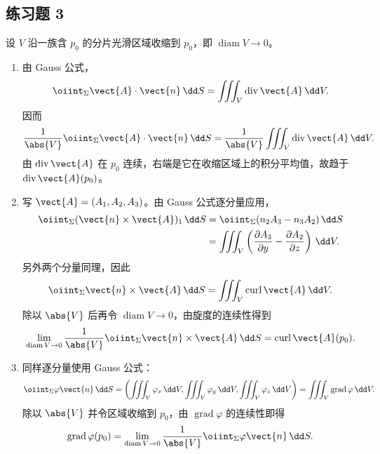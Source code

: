 \subsection*{练习题 3}
\begin{xsolution}
设 $V$ 沿一族含 $p_0$ 的分片光滑区域收缩到 $p_0$，即 $\operatorname{diam}V\to0$。

\begin{enumerate}[label=(\arabic*)]
  \item 由 Gauss 公式，
  \[
    \oiint_{\Sigma}\vect{A}\cdot\vect{n}\,\dd S
    =\iiint_V\operatorname{div}\vect{A}\,\dd V.
  \]
  因而
  \[
    \frac{1}{\abs{V}}\oiint_{\Sigma}\vect{A}\cdot\vect{n}\,\dd S
    =\frac{1}{\abs{V}}\iiint_V\operatorname{div}\vect{A}\,\dd V.
  \]
  由 $\operatorname{div}\vect{A}$ 在 $p_0$ 连续，右端是它在收缩区域上的积分平均值，故趋于 $\operatorname{div}\vect{A}(p_0)$。

  \item 写 $\vect{A}=(A_1,A_2,A_3)$。由 Gauss 公式逐分量应用，
  \begin{align*}
    \oiint_\Sigma(\vect{n}\times\vect{A})_1\,\dd S
    &=\oiint_\Sigma(n_2A_3-n_3A_2)\,\dd S\\
    &=\iiint_V\left(\frac{\partial A_3}{\partial y}-\frac{\partial A_2}{\partial z}\right)\,\dd V.
  \end{align*}
  另外两个分量同理，因此
  \[
    \oiint_\Sigma\vect{n}\times\vect{A}\,\dd S
    =\iiint_V\operatorname{curl}\vect{A}\,\dd V.
  \]
  除以 $\abs{V}$ 后再令 $\operatorname{diam}V\to0$，由旋度的连续性得到
  \[
    \lim_{\operatorname{diam}V\to0}
    \frac{1}{\abs{V}}\oiint_\Sigma\vect{n}\times\vect{A}\,\dd S
    =\operatorname{curl}\vect{A}(p_0).
  \]

  \item 同样逐分量使用 Gauss 公式：
  \[
    \oiint_\Sigma\varphi\vect{n}\,\dd S
    =\left(
      \iiint_V\varphi_x\,\dd V,
      \iiint_V\varphi_y\,\dd V,
      \iiint_V\varphi_z\,\dd V
    \right)
    =\iiint_V\operatorname{grad}\varphi\,\dd V.
  \]
  除以 $\abs{V}$ 并令区域收缩到 $p_0$，由 $\operatorname{grad}\varphi$ 的连续性即得
  \[
    \operatorname{grad}\varphi(p_0)
    =\lim_{\operatorname{diam}V\to0}\frac{1}{\abs{V}}
    \oiint_\Sigma\varphi\vect{n}\,\dd S.
  \]
\end{enumerate}
\end{xsolution}

